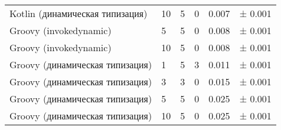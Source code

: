 \begin{table}[h]
\begin{center}
\begin{tabular}{|l|p{}|p{}|p{}|p{}|l|}
Kotlin (динамическая типизация) & 10 & 5 & 0                & 0.007 & ±  0.001 \\
Groovy (invokedynamic)          & 5 & 5 & 0                 & 0.008 & ±  0.001 \\
Groovy (invokedynamic)          & 10 & 5 & 0                & 0.008 & ±  0.001 \\
Groovy (динамическая типизация) & 1 & 5 & 3                 & 0.011 & ±  0.001 \\
Groovy (динамическая типизация) & 3 & 3 & 0                 & 0.015 & ±  0.001 \\
Groovy (динамическая типизация) & 5 & 5 & 0                 & 0.025 & ±  0.001 \\
Groovy (динамическая типизация) & 10 & 5 & 0                & 0.025 & ±  0.001 \\
\hline
\end{tabular}
\end{center}
\end{table} 



